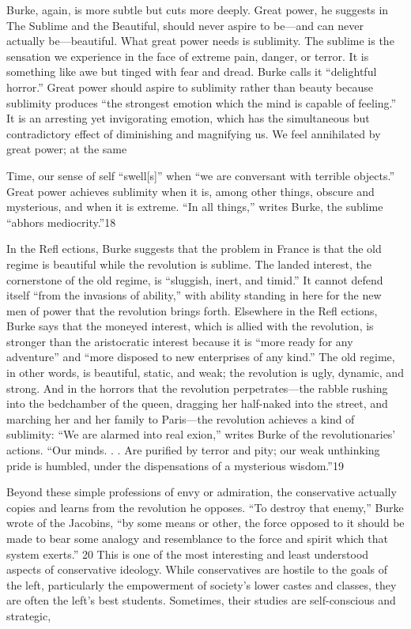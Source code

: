  \par 
Burke, again, is more subtle but cuts more deeply. Great power, he suggests in The Sublime and the Beautiful, should never aspire to be—and can never actually be—beautiful. What great power needs is sublimity. The sublime is the sensation we experience in the face of extreme pain, danger, or terror. It is something like awe but tinged with fear and dread. Burke calls it “delightful horror.” Great power should aspire to sublimity rather than beauty because sublimity produces “the strongest emotion which the mind is capable of feeling.” It is an arresting yet invigorating emotion, which has the simultaneous but contradictory effect of diminishing and magnifying us. We feel annihilated by great power; at the same
 \par 
Time, our sense of self “swell[s]” when “we are conversant with terrible objects.” Great power achieves sublimity when it is, among other things, obscure and mysterious, and when it is extreme. “In all things,” writes Burke, the sublime “abhors mediocrity.”{\color{blue}18}
 \par 
In the Refl ections, Burke suggests that the problem in France is that the old regime is beautiful while the revolution is sublime. The landed interest, the cornerstone of the old regime, is “sluggish, inert, and timid.” It cannot defend itself “from the invasions of ability,” with ability standing in here for the new men of power that the revolution brings forth. Elsewhere in the Refl ections, Burke says that the moneyed interest, which is allied with the revolution, is stronger than the aristocratic interest because it is “more ready for any adventure” and “more disposed to new enterprises of any kind.” The old regime, in other words, is beautiful, static, and weak; the revolution is ugly, dynamic, and strong. And in the horrors that the revolution perpetrates—the rabble rushing into the bedchamber of the queen, dragging her half-naked into the street, and marching her and her family to Paris—the revolution achieves a kind of sublimity: “We are alarmed into real exion,” writes Burke of the revolutionaries’ actions. “Our minds. . . Are purified by terror and pity; our weak unthinking pride is humbled, under the dispensations of a mysterious wisdom.”{\color{blue}19}
 \par 
Beyond these simple professions of envy or admiration, the conservative actually copies and learns from the revolution he opposes. “To destroy that enemy,” Burke wrote of the Jacobins, “by some means or other, the force opposed to it should be made to bear some analogy and resemblance to the force and spirit which that system exerts.” {\color{blue}20} This is one of the most interesting and least understood aspects of conservative ideology. While conservatives are hostile to the goals of the left, particularly the empowerment of society’s lower castes and classes, they are often the left’s best students. Sometimes, their studies are self-conscious and strategic,
